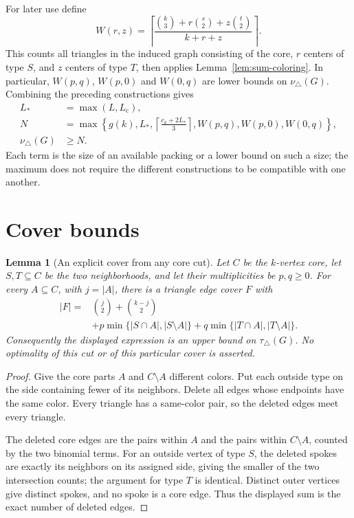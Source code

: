 \documentclass[11pt]{article}
\newtheorem{lemma}[theorem]{Lemma}
\newcommand{\tp}{\nu_{\triangle}}
\newcommand{\tc}{\tau_{\triangle}}
\begin{document}
For later use define
\[
 W(r,z)=\left\lceil
 \frac{\binom{k}{3}+r\binom{s}{2}+z\binom{t}{2}}{k+r+z}
 \right\rceil.
\]
This counts all triangles in the induced graph consisting of the core,
$r$ centers of type $S$, and $z$ centers of type $T$, then applies
Lemma~\ref{lem:sum-coloring}. In particular, $W(p,q)$, $W(p,0)$ and
$W(0,q)$ are lower bounds on $\tp(G)$.
Combining the preceding constructions gives
\begin{equation}\label{eq:packing}
\begin{split}
 L_*&=\max(L,L_{\mathrm c}),\\
 N&=\max\left\{g(k),L_*,
 \left\lceil\frac{c_k+2L_*}{3}\right\rceil,
 W(p,q),W(p,0),W(0,q)\right\},\\
 \tp(G)&\geq N.
\end{split}
\end{equation}
Each term is the size of an available packing or a lower bound on such
a size; the maximum does not require the different constructions to
be compatible with one another.

\section{Cover bounds}\label{sec:covers}

\begin{lemma}[An explicit cover from any core cut]\label{lem:explicit-cut}
Let $C$ be the $k$-vertex core, let $S,T\subseteq C$ be the two
neighborhoods, and let their multiplicities be $p,q\geq0$. For every
$A\subseteq C$, with $j=|A|$, there is a triangle edge cover $F$ with
\begin{align*}
 |F|={}&\binom j2+\binom{k-j}2\\
 &+p\min\{|S\cap A|,|S\setminus A|\}
  +q\min\{|T\cap A|,|T\setminus A|\}.
\end{align*}
Consequently the displayed expression is an upper bound on $\tc(G)$.
No optimality of this cut or of this particular cover is asserted.
\end{lemma}
\begin{proof}
Give the core parts $A$ and $C\setminus A$ different colors. Put each
outside type on the side containing fewer of its neighbors. Delete
all edges whose endpoints have the same color. Every triangle has a
same-color pair, so the deleted edges meet every triangle.

The deleted core edges are the pairs within $A$ and the pairs within
$C\setminus A$, counted by the two binomial terms. For an outside
vertex of type $S$, the deleted spokes are exactly its neighbors on
its assigned side, giving the smaller of the two intersection counts;
the argument for type $T$ is identical. Distinct outer vertices give
distinct spokes, and no spoke is a core edge. Thus the displayed sum
is the exact number of deleted edges.
\end{proof}
\end{document}
